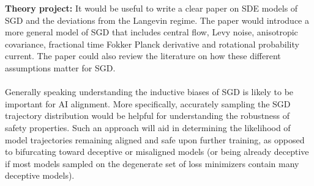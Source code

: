 \documentclass[11pt]{article}
\begin{document}
\textbf{Theory project:} It would be useful to write a clear paper on SDE models of SGD and the deviations from the Langevin regime. The paper would introduce a more general model of SGD that includes central flow, Levy noise, anisotropic covariance, fractional time Fokker Planck derivative and rotational probability current. The paper could also review the literature on how these different assumptions matter for SGD.
\\
\\
Generally speaking understanding the inductive biases of SGD is likely to be important for AI alignment. More specifically, accurately sampling the SGD trajectory distribution would be helpful for understanding the robustness of safety properties. Such an approach will aid in determining the likelihood of model trajectories remaining aligned and safe upon further training, as opposed to bifurcating toward deceptive or misaligned models (or being already deceptive if most models sampled on the degenerate set of loss minimizers contain many deceptive models).
\end{document}
